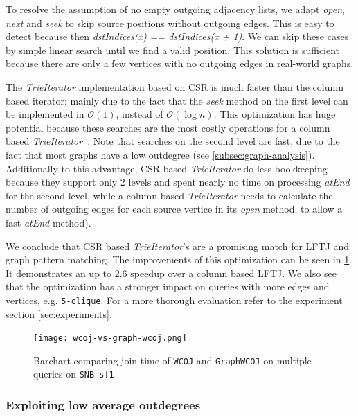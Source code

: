 To resolve the assumption of no empty outgoing adjacency lists, we adapt \textit{open}, \textit{next} and \textit{seek} to skip source
positions without outgoing edges.
This is easy to detect because then \textit{dstIndices(x) == dstIndices(x + 1)}.
We can skip these cases by simple linear search until we find a valid position.
This solution is sufficient because there are only a few vertices with no outgoing edges in real-world graphs.

The \textit{TrieIterator} implementation based on \textsc{CSR} is much faster than the column based iterator; mainly due to the fact
that the \textit{seek} method on the first level can be implemented in $\mathcal{O}(1)$, instead of $\mathcal{O}(\log n)$.
This optimization has huge potential because these searches are the most costly operations for a column based
\textit{TrieIterator}~\cite{myria-detailed}.
Note that searches on the second level are fast, due to the fact that most graphs have a low outdegree (see
\cref{subsec:graph-analysis}).
Additionally to this advantage, \textsc{CSR} based \textit{TrieIterator} do less bookkeeping because they support only 2 levels and spent
nearly no time on processing \textit{atEnd} for the second level, while a column based \textit{TrieIterator} needs to calculate the
number of outgoing edges for each source vertice in its \textit{open} method, to allow a fast \textit{atEnd} method).

We conclude that \textsc{CSR} based \textit{TrieIterator}'s are a promising match for \textsc{LFTJ} and graph pattern matching.
The improvements of this optimization can be seen in \cref{fig:wcoj-vs-graphWCOJ}.
It demonstrates an up to 2.6 speedup over a column based \textsc{LFTJ}. %
We also see that the optimization has a stronger impact on queries with more edges and vertices, e.g. \texttt{5-clique}.
For a more thorough evaluation refer to the experiment section \ref{sec:experiments}.

\begin{figure}
\centering
\texttt{[image: wcoj-vs-graph-wcoj.png]}
\caption{Barchart comparing join time of \texttt{WCOJ} and \texttt{GraphWCOJ} on multiple queries on \texttt{SNB-sf1}}
\label{fig:wcoj-vs-graphWCOJ}
\end{figure}


\subsubsection{Exploiting low average outdegrees}

